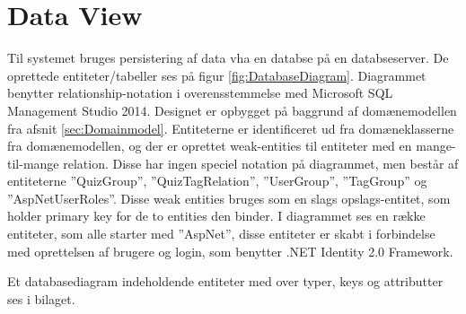 \section{Data View}

Til systemet bruges persistering af data vha en databse på en databseserver. De oprettede entiteter/tabeller ses på figur \ref{fig:DatabaseDiagram}. Diagrammet benytter relationship-notation i overensstemmelse med Microsoft SQL Management Studio 2014. %
Designet er opbygget på baggrund af domænemodellen fra afsnit \ref{sec:Domainmodel}. Entiteterne er identificeret ud fra domæneklasserne fra domænemodellen, og der er oprettet weak-entities til entiteter med en mange-til-mange relation. Disse har ingen speciel notation på diagrammet, men består af entiteterne ''QuizGroup'', ''QuizTagRelation'', ''UserGroup'', ''TagGroup'' og ''AspNetUserRoles''. Disse weak entities bruges som en slags opslags-entitet, som holder primary key for de to entities den binder.
I diagrammet ses en række entiteter, som alle starter med ''AspNet'', disse entiteter er skabt i forbindelse med oprettelsen af brugere og login, som benytter .NET Identity 2.0 Framework. 


Et databasediagram indeholdende entiteter med over typer, keys og attributter ses i bilaget.

